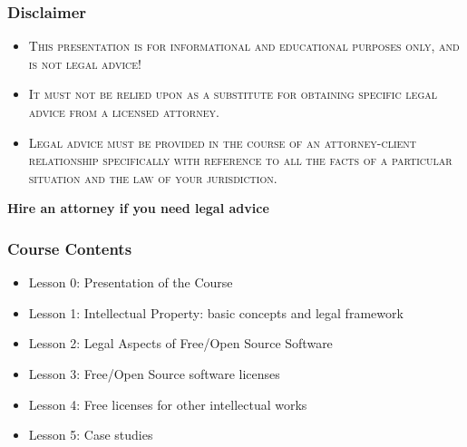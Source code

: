 \documentclass{beamer}
\begin{document}
\begin{frame}
\frametitle{Disclaimer}

\begin{itemize}
\item \textsc{This presentation is for \alert{informational} and \alert{educational purposes only}, and \alert{is not legal advice!}}
\item \textsc{It must not be relied upon as a substitute for obtaining specific legal advice from a licensed attorney.}
\item \textsc{Legal advice must be provided in the course of an attorney-client relationship specifically with reference to \alert{all the facts of a particular situation} and the \alert{law of your jurisdiction}.} 
\end{itemize}

\begin{center}
\textbf{Hire an attorney if you need legal advice}
\end{center}

\end{frame}




\begin{frame}
  \frametitle{Course Contents}

  \begin{itemize}
    \item Lesson 0: Presentation of the Course
    \item Lesson 1: Intellectual Property: basic concepts and legal framework
    \item Lesson 2: Legal Aspects of Free/Open Source Software
    \item Lesson 3: Free/Open Source software licenses
    \item \alert{Lesson 4: Free licenses for other intellectual works}
    \item Lesson 5: Case studies
  \end{itemize}

\end{frame}
\end{document}
